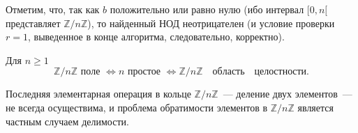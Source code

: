 \documentclass{../../template/mai_book}
\begin{document}

    Отметим, что, так как $b$ положительно или равно нулю (ибо интервал $[0, n [$ представляет $\mathbb{Z}/n\mathbb{Z}$), то найденный НОД неотрицателен (и \linebreak условие проверки $r = 1$, выведенное в конце алгоритма, следовательно, \linebreak корректно).

    \begin{sled}
    \hspace*{0.5cm}
    Для $n \geqslant 1$
    $$\mathbb{Z}/n\mathbb{Z}\,\,\mathrm{поле}\,\,\Leftrightarrow n\,\,\mathrm{простое}\,\,\Leftrightarrow \mathbb{Z}/n\mathbb{Z}\quad \mathrm{область\quad целостности}.$$
    \end{sled}
    Последняя элементарная операция в кольце $\mathbb{Z}/n\mathbb{Z}$~— деление двух элементов~— не всегда
    осуществима, и проблема обратимости элементов в $\mathbb{Z}/n\mathbb{Z}$ является частным случаем делимости.
\end{document}
